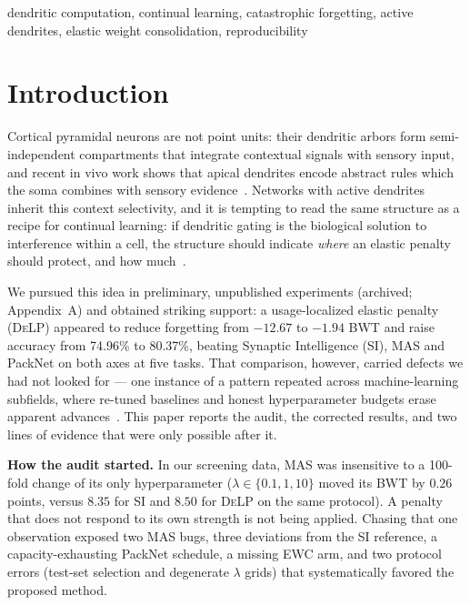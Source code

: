 \documentclass[conference]{IEEEtran}
\newcommand{\delp}{\textsc{DeLP}}
\begin{document}
\begin{IEEEkeywords}
dendritic computation, continual learning, catastrophic forgetting, active dendrites, elastic
weight consolidation, reproducibility
\end{IEEEkeywords}

\section{Introduction}
Cortical pyramidal neurons are not point units: their dendritic arbors form semi-independent
compartments that integrate contextual signals with sensory input, and recent in vivo work shows
that apical dendrites encode abstract rules which the soma combines with sensory
evidence~\cite{zhang2026}. Networks with active dendrites~\cite{iyer2022} inherit this
context selectivity, and it is tempting to read the same structure as a recipe for continual
learning: if dendritic gating is the biological solution to interference within a cell, the
structure should indicate \emph{where} an elastic penalty~\cite{kirkpatrick2017,zenke2017} should
protect, and how much~\cite{mallya2018}.

We pursued this idea in preliminary, unpublished experiments (archived; Appendix~A) and obtained
striking support: a usage-localized elastic penalty (\delp{})
appeared to reduce forgetting from $-12.67$ to $-1.94$ BWT and raise accuracy from 74.96\% to
80.37\%, beating Synaptic Intelligence (SI), MAS and PackNet on both axes at five tasks. That
comparison, however, carried defects we had not looked for --- one instance of a pattern repeated
across machine-learning subfields, where re-tuned baselines and honest hyperparameter budgets
erase apparent advances~\cite{musgrave2020,lucic2018,melis2018}. This paper reports the audit, the
corrected results, and two lines of evidence that were only possible after it.

\noindent\textbf{How the audit started.} In our screening data, MAS was insensitive to a
100-fold change of its only hyperparameter ($\lambda\in\{0.1,1,10\}$ moved its BWT by $0.26$
points, versus $8.35$ for SI and $8.50$ for \delp{} on the same protocol). A penalty that does not
respond to its own strength is not being applied. Chasing that one observation exposed two MAS
bugs, three deviations from the SI reference, a capacity-exhausting PackNet schedule, a missing
EWC arm, and two protocol errors (test-set selection and degenerate $\lambda$ grids) that
systematically favored the proposed method.
\end{document}

